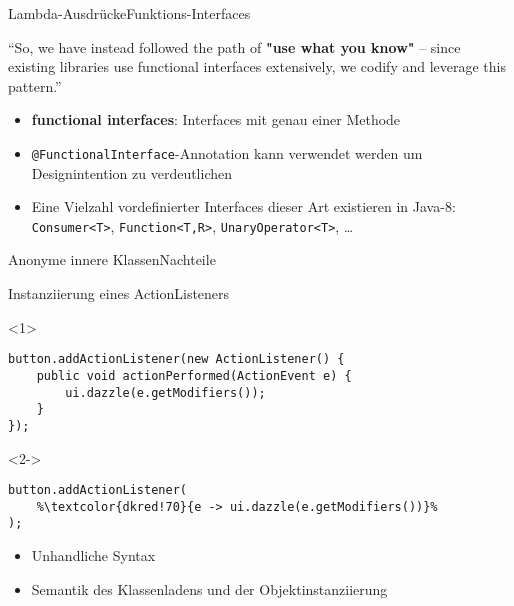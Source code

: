 \begin{frame}[fragile]{Lambda-Ausdrücke}{Funktions-Interfaces}

    \centering
    \begin{minipage}[b]{0.75\textwidth}
        \begin{block}{\citet{goetz13}}
            \enquote{So, we have instead followed the path of \textbf{"use what you know"} -- since existing libraries use functional interfaces
            extensively, we codify and leverage this pattern.}
        \end{block}
    \end{minipage}

    \begin{itemize}
        \item<2-> \textbf{functional interfaces}: Interfaces mit genau einer Methode
        \item<3-> \texttt{@FunctionalInterface}-Annotation kann verwendet werden um 
        Designintention zu verdeutlichen
        \item<4-> Eine Vielzahl vordefinierter Interfaces dieser Art existieren in Java-8:\\
        \texttt{Consumer<T>}, \texttt{Function<T,R>}, \texttt{UnaryOperator<T>}, \dots
    \end{itemize}
\end{frame}


\begin{frame}[fragile]{Anonyme innere Klassen}{Nachteile}
    \begin{center}
        \begin{minipage}[b]{0.75\textwidth}
            \begin{block}{Instanziierung eines ActionListeners \citep{goetz13}}
                \begin{onlyenv}<1>
                    \begin{lstlisting}
button.addActionListener(new ActionListener() {
    public void actionPerformed(ActionEvent e) {
        ui.dazzle(e.getModifiers());
    }
});
                    \end{lstlisting}
                \end{onlyenv}
                \begin{onlyenv}<2->
                    \begin{lstlisting}
button.addActionListener(
    %\textcolor{dkred!70}{e -> ui.dazzle(e.getModifiers())}%
);
                    \end{lstlisting}
                \end{onlyenv}
            \end{block}
        \end{minipage}
    \end{center}

    \begin{itemize}
        \item \textcolor<3->{dkgreen!70}{Unhandliche Syntax}
        \item \textcolor<4->{dkgreen!70}{Semantik des Klassenladens und der Objektinstanziierung}
    \end{itemize}

\end{frame}

